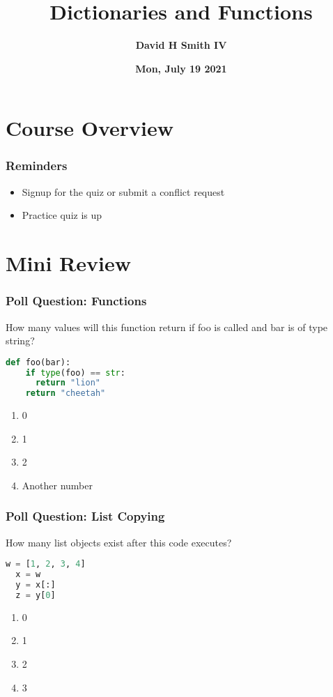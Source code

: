 \documentclass{beamer}
\title{\textbf{Dictionaries and Functions}}
\author{\textbf{David H Smith IV}}
\institute[\textbf{UIUC}]{\textbf{University of Illinois Urbana-Champaign}}
\date{\textbf{Mon, July 19 2021}}
\begin{document}
\frame{\titlepage}

\section{Course Overview}

%
%
\begin{frame}
  \frametitle{Reminders}
  \begin{itemize}
    \item Signup for the quiz or submit a conflict request
    \item Practice quiz is up
  \end{itemize}
\end{frame}

\section{Mini Review}

%
%
\begin{frame}[fragile]
  \frametitle{Poll Question: Functions} 
  \vfill
  How many values will this function return if foo is called and bar is of type string?
  \begin{lstlisting}[language=Python, autogobble]
  def foo(bar):
    if type(foo) == str:
      return "lion"
    return "cheetah"
  \end{lstlisting}
  \vfill
  \begin{enumerate}[A]
    \item 0
    \item 1
    \item 2
    \item Another number
  \end{enumerate}
\end{frame}

%
%
\begin{frame}[fragile]
  \frametitle{Poll Question: List Copying} 
  How many list objects exist after this code executes?
  \vfill
  \begin{lstlisting}[language=Python, autogobble]
  w = [1, 2, 3, 4]
  x = w
  y = x[:]
  z = y[0]
  \end{lstlisting}
  \vfill
  \begin{enumerate}[A]
    \item 0
    \item 1
    \item 2
    \item 3
  \end{enumerate}
\end{frame}
\end{document}
